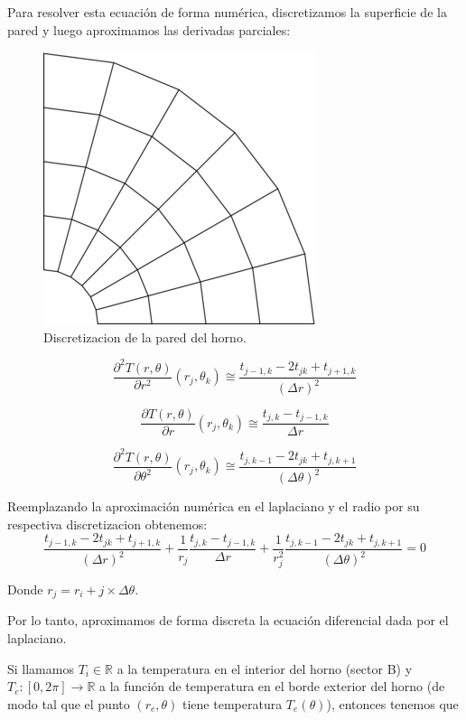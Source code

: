Para resolver esta ecuación de forma numérica, discretizamos la superficie de la pared y luego aproximamos las derivadas parciales:

\begin{figure}[ht]
\begin{center}
\includegraphics[width=0.2\columnwidth]{catedra/disc.png}
\caption{Discretizacion de la pared del horno.}
\end{center}
\end{figure}

\begin{equation}
\frac{\partial^2T(r,\theta)}{\partial r^2}(r_j,\theta_k) \cong \frac{t_{j-1,k}-2t_{jk}+t_{j+1,k}}{(\Delta r)^2}
\end{equation}

\begin{equation}
\frac{\partial T(r,\theta)}{\partial r}(r_j,\theta_k) \cong \frac{t_{j,k}-t_{j-1,k}}{\Delta r}
\end{equation}

\begin{equation}
\frac{\partial^2T(r,\theta)}{\partial \theta^2}(r_j,\theta_k) \cong \frac{t_{j,k-1}-2t_{jk}+t_{j,k+1}}{(\Delta \theta)^2}
\end{equation}

Reemplazando la aproximación numérica en el laplaciano y el radio por su respectiva discretizacion obtenemos:
\begin{equation}\label{calor}
\frac{t_{j-1,k}-2t_{jk}+t_{j+1,k}}{(\Delta r)^2}
+ \frac{1}{r_j}
\frac{t_{j,k}-t_{j-1,k}}{\Delta r}
+
\frac{1}{r_j^2}
\frac{t_{j,k-1}-2t_{jk}+t_{j,k+1}}{(\Delta \theta)^2} = 0
\end{equation}

Donde $r_j = r_i + j \times \Delta\theta$.

Por lo tanto, aproximamos de forma discreta la ecuación diferencial dada por el laplaciano.


Si llamamos $T_i \in \mathbb{R}$ a la temperatura en el interior del horno (sector B) y $T_e : [0,2\pi] \rightarrow \mathbb{R}$ a la función de temperatura en el borde exterior del horno (de modo tal que el punto $(r_e,\theta)$ tiene temperatura $T_e(\theta)$), entonces tenemos que

